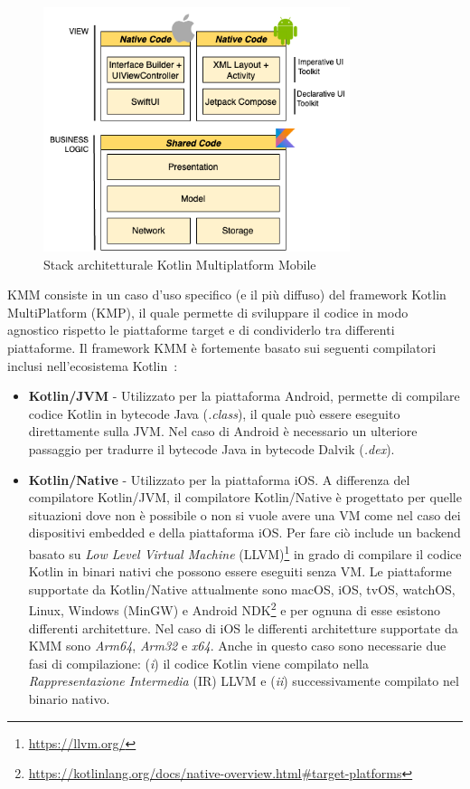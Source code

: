 \begin{figure}[H]
    \centering
    \includegraphics[width=0.8\textwidth]{img/stack_kmm.png}
    \caption{Stack architetturale Kotlin Multiplatform Mobile}
    \label{stackKMM}
\end{figure}

KMM consiste in un caso d'uso specifico (e il più diffuso) del framework Kotlin MultiPlatform (KMP), il quale permette di sviluppare il codice in modo agnostico rispetto le piattaforme target e di condividerlo tra differenti piattaforme. Il framework KMM è fortemente basato sui seguenti compilatori inclusi nell'ecosistema Kotlin~\cite{nagy2022simplifying}:

\begin{itemize}
    \item \textbf{Kotlin/JVM} - Utilizzato per la piattaforma Android, permette di compilare codice Kotlin in bytecode Java (\textit{.class}), il quale può essere eseguito direttamente sulla JVM. Nel caso di Android è necessario un ulteriore passaggio per tradurre il bytecode Java in bytecode Dalvik (\textit{.dex}).

    \item \textbf{Kotlin/Native} - Utilizzato per la piattaforma iOS. A differenza del compilatore Kotlin/JVM, il compilatore Kotlin/Native è progettato per quelle situazioni dove non è possibile o non si vuole avere una VM come nel caso dei dispositivi embedded e della piattaforma iOS. Per fare ciò include un backend basato su \textit{Low Level Virtual Machine} (LLVM)\footnote{\href{https://llvm.org/}{https://llvm.org/}} in grado di compilare il codice Kotlin in binari nativi che possono essere eseguiti senza VM\cite{nagy2022simplifying}. Le piattaforme supportate da Kotlin/Native attualmente sono macOS, iOS, tvOS, watchOS, Linux, Windows (MinGW) e Android NDK\footnote{\href{https://kotlinlang.org/docs/native-overview.html\#target-platforms}{https://kotlinlang.org/docs/native-overview.html\#target-platforms}} e per ognuna di esse esistono differenti architetture. Nel caso di iOS le differenti architetture supportate da KMM sono \textit{Arm64}, \textit{Arm32} e \textit{x64}. Anche in questo caso sono necessarie due fasi di compilazione: (\textit{i}) il codice Kotlin viene compilato nella \textit{Rappresentazione Intermedia} (IR) LLVM e (\textit{ii}) successivamente compilato nel binario nativo.
\end{itemize}

